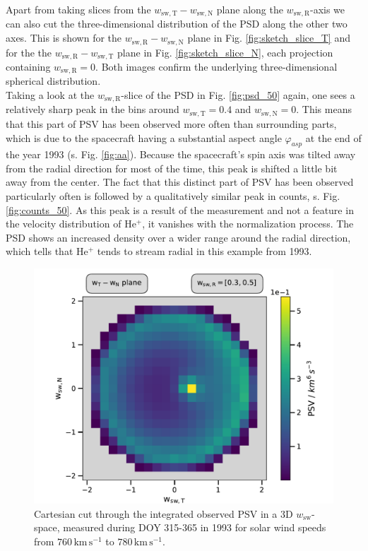 Apart from taking slices from the $w_\mathrm{sw,T} - w_\mathrm{sw,N}$ plane along the $w_\mathrm{sw,R}$-axis we can also cut the three-dimensional distribution of the PSD along the other two axes. This is shown for the $w_\mathrm{sw,R} - w_\mathrm{sw,N}$ plane in Fig. \ref{fig:sketch_slice_T} and for the the $w_\mathrm{sw,R} - w_\mathrm{sw,T}$ plane in Fig. \ref{fig:sketch_slice_N}, each projection containing $w_\mathrm{sw,R} = 0$.
Both images confirm the underlying three-dimensional spherical distribution.
\\
Taking a look at the $w_\mathrm{sw,R}$-slice of the PSD in Fig. \ref{fig:psd_50} again, one sees a relatively sharp peak in the bins around $w_\mathrm{sw,T} = 0.4$ and $w_\mathrm{sw,N} = 0$. This means that this part of PSV has been observed more often than surrounding parts, which is due to the spacecraft having a substantial aspect angle $\varphi_{asp}$ at the end of the year 1993 (s. Fig. \ref{fig:aa}). Because the spacecraft's spin axis was tilted away from the radial direction for most of the time, this peak is shifted a little bit away from the center. The fact that this distinct part of PSV has been observed particularly often is followed by a qualitatively similar peak in counts, s. Fig. \ref{fig:counts_50}. 
As this peak is a result of the measurement and not a feature in the velocity distribution of $\mathrm{He^{+}}$, it vanishes with the normalization process. The PSD shows an increased density over a wider range around the radial direction, which tells that $\mathrm{He^{+}}$ tends to stream radial in this example from 1993.
\begin{figure}[h]
	\includegraphics[width=.85\textwidth]{Figures/slice_50_norm.pdf}
	\centering
	\caption{Cartesian cut through the integrated observed PSV in a 3D $w_\mathrm{sw}$-space, measured during DOY 315-365 in 1993 for solar wind speeds from $760 \, \mathrm{km\,s^{-1}}$ to $780 \, \mathrm{km\,s^{-1}}$.}
	\label{fig:norm_50}
\end{figure}
